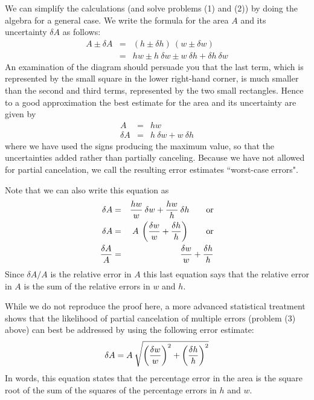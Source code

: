 We can simplify the calculations (and solve problems (1) and (2)) by doing
the algebra for a general case.
We write the formula for the area $A$ and its uncertainty $\delta A$
as follows:
\begin{eqnarray*}
A \pm \delta A& = & (h \pm \delta h) \: (w \pm \delta w) \\
  & = & h w  \pm h \: \delta w  \pm w \: \delta h + \delta h \:
        \delta w
\end{eqnarray*}
An examination of the diagram should persuade you that the last
term, which is represented by the small square in the lower right-hand
corner, is much smaller than the second and third terms, represented
by the two small rectangles.  Hence to a good approximation the
best estimate for the area and its
uncertainty are given by
\begin{eqnarray*}
A &=& hw \\
\delta A &=& h \: \delta w + w \: \delta h
\end{eqnarray*}
where we have used the signs producing the maximum
value, so
that the uncertainties added rather than partially canceling.  Because
we have not allowed for partial cancelation, we call the resulting
error estimates ``worst-case errors".

 Note that we can also write this equation as
\begin{eqnarray*}
\delta A & = & {{h w} \over {w}} \: \delta w + {{h w} \over {h}} \:
               \delta h \qquad \mbox{or} \\
\delta A & = & A \: \left({{\delta w} \over {w}} + {{\delta h} \over {h}}
               \right) \qquad \mbox{or} \\
{\delta A \over A}& = & {{\delta w} \over {w}} + {{\delta h} \over {h}}
\end{eqnarray*}
Since $\delta A/A$ is the relative error in $A$ this last equation says
that the relative error in $A$ is the sum of the relative errors in $w$ and $h$.

While we do not reproduce the proof here, a
more advanced statistical treatment shows that the likelihood of
partial cancelation of multiple errors (problem (3) above) can
best be addressed by using the following error estimate: 
\[
\delta A = A \: \sqrt{ \left({{\delta w} \over {w}} \right)^{2} + \left(
           {{\delta h} \over {h}} \right)^{2} }
\]
In words, this equation states that the percentage error in the
area is the square root of the sum of the squares of the
percentage errors in $h$ and $w$.  %

